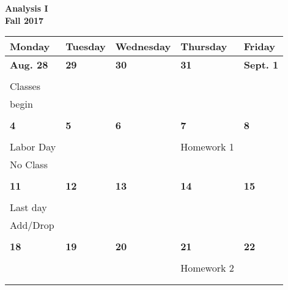 \documentclass[letter, 12pt]{article}
\begin{document}
\begin{center}\textbf{Analysis I}\\
\textbf{Fall 2017}
\end{center}
\begin{center}
\begin{tabular}{|l|l|l|l|l|}
\hline

{\bf \phantom{xx}Monday\phantom{x}}
 & {\bf \phantom{xx}Tuesday\phantom{x}}
 & {\bf \phantom{x}Wednesday\phantom{}}
 & {\bf \phantom{x}Thursday\phantom{x}}
 & {\bf \phantom{xx}Friday\phantom{xx}} \\
\hline


\textbf{Aug. 28} & \textbf{29} & \textbf{30} & \textbf{31} & \textbf{Sept. 1} \\
&  &  &  & \\
%
{\small Classes}&  &  &  & \\
%
{\small begin}&  &  &  & \\
%
&  &  &  & \\
\hline


\textbf{4} & \textbf{5} & \textbf{6} & \textbf{7} & \textbf{8} \\
&  &  &  & \\
%
{\small Labor Day}&  &  & Homework 1 & \\
%
{\small No Class}&  &  &  & \\
%
&  &  &  & \\
\hline



\textbf{11} & \textbf{12} & \textbf{13} & \textbf{14} & \textbf{15} \\
&  &  &  & \\
%
{\small Last day}&  &  &  & \\
%
{\small Add/Drop}&  &  &  & \\
%
&  &  &  & \\
\hline



\textbf{18} & \textbf{19} & \textbf{20} & \textbf{21} & \textbf{22} \\
&  &  &  & \\
%
&  &  &  Homework 2& \\
%
&  &  &  & \\
%
&  &  &  & \\
\hline



\end{tabular}
\end{center}
\end{document}
